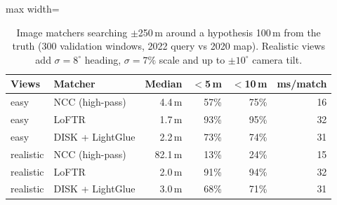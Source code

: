 \begin{table}[t]
\centering
\small
\caption{Image matchers searching $\pm$250\,m around a hypothesis 100\,m from the truth (300 validation windows, 2022 query vs 2020 map). Realistic views add $\sigma=8^\circ$ heading, $\sigma=7\%$ scale and up to $\pm10^\circ$ camera tilt.}
\label{tab:matchers}
\begin{adjustbox}{max width=\linewidth}
\begin{tabular}{llrrrr}
\toprule
Views & Matcher & Median & $<$5\,m & $<$10\,m & ms/match \\
\midrule
easy & NCC (high-pass) & 4.4\,m & 57\% & 75\% & 16 \\
easy & LoFTR & 1.7\,m & 93\% & 95\% & 32 \\
easy & DISK + LightGlue & 2.2\,m & 73\% & 74\% & 31 \\
realistic & NCC (high-pass) & 82.1\,m & 13\% & 24\% & 15 \\
realistic & LoFTR & 2.0\,m & 91\% & 94\% & 32 \\
realistic & DISK + LightGlue & 3.0\,m & 68\% & 71\% & 31 \\
\bottomrule
\end{tabular}
\end{adjustbox}
\end{table}

